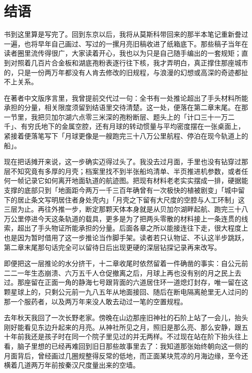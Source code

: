 \clearpage
\chapter*{结\quad 语}
{}

书到这里算是写完了。回到东京以后，我将从莫斯科带回来的那半本笔记重新誊过一遍，也将早年自己画过、写过的一摞月亮旧稿收进了纸箱底下。那些稿子当年在读者圈里流传得很广，大家读着开心，我也以为只是自己随手编出的一套规矩；直到对照着几百片合金板和湖底孢粉表逐行往下核，我才弄明白，真正撑住那座城市的，只是一份两万年都没有人肯去修改的旧规程，与浪漫的幻想或高深的奇迹都扯不上关系。

在著者中文版序言里，我曾提前交代过一句：全书有一处推论超出了手头材料所能承担的分量，相关限度须留到结语里交待清楚。这一处，便落在第二章末尾。在那一节里，我把贝加尔湖六点零三米深的孢粉断层、题头上的「计口三十一万二千」、有穷氏地下的金属空腔，还有月球的转动惯量与平均密度摆在一张桌面上，紧接着便落笔写下「月球更像是一艘跑完三十八万公里航程、停泊在现今轨道上的船」。

现在把话摊开来说，这一步确实迈得过头了。我没去过月面，手里也没有钻穿过那层不知究竟有多厚的月壳；档案里找不到半张船坞清单、半页推进机参数，或者任何一帧记录它如何离开地面轨道的航迹图。把现有材料老老实实摆成一排，硬据能支撑的底部只到「地面距今两万一千三百年确曾有一次极快的植被剧变」「城中留下的居止条文写明居住者身处壳内」「月壳之下留有大尺度的空腔与人工环制」这三层为止。再往外推一步，断定那颗天体本身就是从贝加尔湖畔起航、跑完三十八万公里停进今天这条轨道的载具，更多是为了把两头零散的材料接上一条连贯的线索，超出了手头物证所能承担的分量。后面各章之所以能接连往下走，很大程度上也是因为暂时借用了这一步推论当作脚手架。读者若只认物证、不认这半步跳跃，第二章末尾那句话完全可以留待日后出现更硬的深层钻探记录再来改写。

即便把这一层推论的水分挤干，十二章收尾时依然留着一件确凿的事实：自公元前二二一年生态崩溃、六万五千人仓促撤离之后，月球上再也没有别的月之民上去过。那座留在正面一角的静海七号跟背面的六道居住环一道熄灯封存，唯一留在这颗星球上的，只剩公元前一九八五年从地面接回、随后在断电隔离舱里无人过问的那一个服药者，以及两万年来没人敢去动过一笔的空置规程。

去年秋天我回了一次长野老家。傍晚在山边那座旧神社的石阶上站了一会儿，抬头刚好能看见东边升起来的月亮。从神社所见之月，照旧是那么亮、那么安静，跟五十年前我还是孩子时在同一个院子里见过的并无两样。不过现在站在阶下抬头往上看，脑子里想的已经再难回到旧日那些故事里去了：我知道那张始终朝向这一侧的月面背后，曾经画过几圈规整得反常的低地，而正面某块荒凉的月海边缘，至今还横着几道两万年前按秦汉尺度量出来的空墙。

